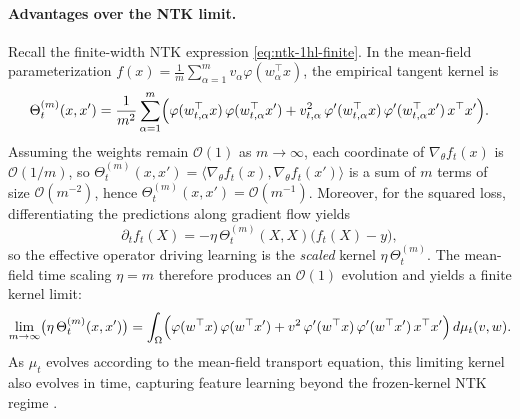\paragraph{Advantages over the NTK limit.}
Recall the finite-width NTK expression \eqref{eq:ntk-1hl-finite}. In the mean-field
parameterization $f(x)=\frac1m\sum_{\alpha=1}^m v_\alpha\varphi(w_\alpha^\top x)$, the empirical tangent
kernel is
\begin{equation}
	\Theta^{(m)}_t(x,x')
	=
	\frac{1}{m^2}\sum_{\alpha=1}^m
	\Bigl(
	\varphi(w_{t,\alpha}^\top x)\,\varphi(w_{t,\alpha}^\top x')
	+
	v_{t,\alpha}^2\,\varphi'(w_{t,\alpha}^\top x)\,\varphi'(w_{t,\alpha}^\top x')\,x^\top x'
	\Bigr).
	\label{eq:mf-ntk-equation}
\end{equation}
Assuming the weights remain $\mathcal O(1)$ as $m\to\infty$, each coordinate of $\nabla_\theta f_t(x)$ is
$\mathcal O(1/m)$, so $\Theta^{(m)}_t(x,x')=\langle\nabla_\theta f_t(x),\nabla_\theta f_t(x')\rangle$ is a sum
of $m$ terms of size $\mathcal O(m^{-2})$, hence $\Theta^{(m)}_t(x,x')=\mathcal O(m^{-1})$.
Moreover, for the squared loss, differentiating the predictions along gradient flow yields
\[
	\partial_t f_t(X)
	=
	-\eta\,\Theta^{(m)}_t(X,X)\bigl(f_t(X)-y\bigr),
\]
so the effective operator driving learning is the \emph{scaled} kernel $\eta\,\Theta^{(m)}_t$. The mean-field
time scaling $\eta=m$ therefore produces an $\mathcal O(1)$ evolution and yields a finite kernel limit:
\[
	\lim_{m\to\infty}\bigl(\eta\,\Theta^{(m)}_t(x,x')\bigr)
	=
	\int_\Omega
	\Bigl(
	\varphi(w^\top x)\,\varphi(w^\top x')
	+
	v^2\,\varphi'(w^\top x)\,\varphi'(w^\top x')\,x^\top x'
	\Bigr)\,d\mu_t(v,w).
\]
As $\mu_t$ evolves according to the mean-field transport equation, this limiting kernel also evolves in time,
capturing feature learning beyond the frozen-kernel NTK regime \citep{golikov2025deepneuralnetworkslargewidthbehavior}.

